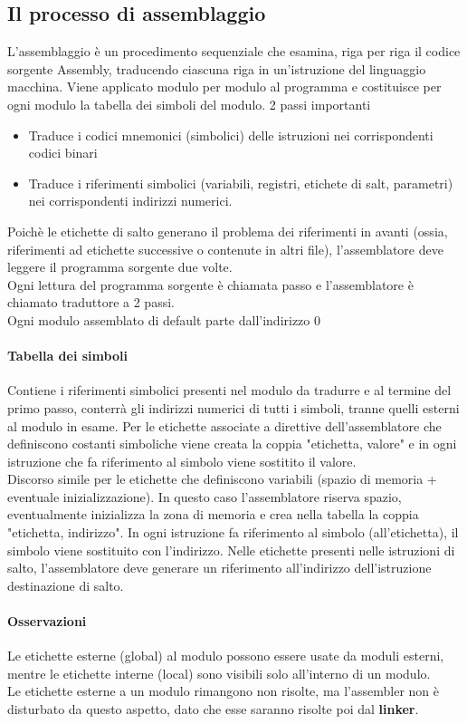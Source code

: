 \documentclass[12pt, a4paper, openany]{book}
\begin{document}
\subsection{Il processo di assemblaggio}
L'assemblaggio è un procedimento sequenziale che esamina, riga per riga il codice sorgente
Assembly, traducendo ciascuna riga in un'istruzione del linguaggio macchina.
Viene applicato modulo per modulo al programma e costituisce per ogni modulo la tabella dei 
simboli del modulo.
2 passi importanti \begin{itemize}
    \item Traduce i codici mnemonici (simbolici) delle istruzioni nei corrispondenti
    codici binari
    \item Traduce i riferimenti simbolici (variabili, registri, etichete di salt, parametri)
    nei corrispondenti indirizzi numerici.
\end{itemize}
Poichè le etichette di salto generano il problema dei riferimenti in avanti (ossia,
riferimenti ad etichette successive o contenute in altri file), l'assemblatore deve leggere
il programma sorgente due volte.
\\ Ogni lettura del programma sorgente è chiamata passo e l'assemblatore è chiamato traduttore
a 2 passi.
\\ Ogni modulo assemblato di default parte dall'indirizzo 0
\paragraph*{Tabella dei simboli} Contiene i riferimenti simbolici presenti nel modulo
da tradurre e al termine del primo passo, conterrà gli indirizzi numerici
di tutti i simboli, tranne quelli esterni al modulo in esame.
Per le etichette associate a direttive dell'assemblatore che definiscono costanti
simboliche viene creata la coppia "etichetta, valore" e in ogni istruzione che
fa riferimento al simbolo viene sostitito il valore.
\\ Discorso simile per le etichette che definiscono variabili (spazio di memoria +
eventuale inizializzazione). In questo caso l'assemblatore riserva spazio, eventualmente
inizializza la zona di memoria e crea nella tabella la coppia "etichetta, indirizzo".
In ogni istruzione fa riferimento al simbolo (all'etichetta), il simbolo viene
sostituito con l'indirizzo.
Nelle etichette presenti nelle istruzioni di salto, l'assemblatore deve generare un
riferimento all'indirizzo dell'istruzione destinazione di salto.
\paragraph*{Osservazioni} Le etichette esterne (global) al modulo possono essere usate
da moduli esterni, mentre le etichette interne (local) sono visibili solo all'interno 
di un modulo.
\\ Le etichette esterne a un modulo rimangono non risolte, ma l'assembler non è disturbato
da questo aspetto, dato che esse saranno risolte poi dal \textbf{linker}.
\end{document}

